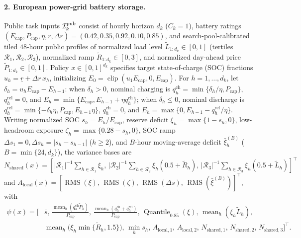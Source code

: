 \paragraph{2. European power-grid battery storage.}
Public task inputs $\mathcal{I}_k^{\mathrm{pub}}$ consist of hourly horizon $d_k$ ($C_k = 1$), battery ratings $(E_{\mathrm{cap}}, P_{\mathrm{cap}}, \eta, \underline{r}, \Delta r) = (0.42, 0.35, 0.92, 0.10, 0.85)$, and search-pool-calibrated tiled $48$-hour public profiles of normalized load level $\tilde{L}_{1:d_k} \in [0,1]$ (tertiles $\mathcal{R}_1, \mathcal{R}_2, \mathcal{R}_3$), normalized ramp $\tilde{R}_{1:d_k} \in [0,3]$, and normalized day-ahead price $\tilde{P}_{1:d_k} \in [0,1]$. Policy $x \in [0,1]^{d_k}$ specifies target state-of-charge (SOC) fractions $u_h = \underline{r} + \Delta r\, x_h$, initializing $E_0 = \operatorname{clip}(u_1 E_{\mathrm{cap}}, 0, E_{\mathrm{cap}})$. For $h = 1,\dots,d_k$, let $\delta_h = u_h E_{\mathrm{cap}} - E_{h-1}$: when $\delta_h > 0$, nominal charging is $q_h^{\mathrm{ch}} = \min\{\delta_h/\eta, P_{\mathrm{cap}}\}$, $q_h^{\mathrm{rel}} = 0$, and $E_h = \min\{E_{\mathrm{cap}}, E_{h-1} + \eta q_h^{\mathrm{ch}}\}$; when $\delta_h \le 0$, nominal discharge is $q_h^{\mathrm{rel}} = \min\{-\delta_h\eta, P_{\mathrm{cap}}, E_{h-1}\eta\}$, $q_h^{\mathrm{ch}} = 0$, and $E_h = \max\{0, E_{h-1} - q_h^{\mathrm{rel}}/\eta\}$. Writing normalized SOC $s_h = E_h / E_{\mathrm{cap}}$, reserve deficit $\xi_h = \max\{1 - s_h, 0\}$, low-headroom exposure $\zeta_h = \max\{0.28 - s_h, 0\}$, SOC ramp $\Delta s_1 = 0, \Delta s_h = |s_h - s_{h-1}|$ ($h \ge 2$), and $B$-hour moving-average deficit $\bar{\xi}_h^{(B)}$ ($B = \min\{24, d_k\}$), the variance bases are $N_{\mathrm{shared}}(x) = [|\mathcal{R}_1|^{-1}\sum_{h\in\mathcal{R}_1}\xi_h,\, |\mathcal{R}_2|^{-1}\sum_{h\in\mathcal{R}_2}\xi_h(0.5+\tilde{R}_h),\, |\mathcal{R}_3|^{-1}\sum_{h\in\mathcal{R}_3}\xi_h(0.5+\tilde{L}_h)]^\top$ and $A_{\mathrm{local}}(x) = [\operatorname{RMS}(\xi),\, \operatorname{RMS}(\zeta),\, \operatorname{RMS}(\Delta s),\, \operatorname{RMS}(\bar{\xi}^{(B)})]^\top$, with
\begin{align*}
  \psi(x) = \Big[&\bar{s},\, \tfrac{\operatorname{mean}_h(q_h^{\mathrm{ch}}\tilde{P}_h)}{P_{\mathrm{cap}}},\, \tfrac{\operatorname{mean}_h(q_h^{\mathrm{ch}}+q_h^{\mathrm{rel}})}{P_{\mathrm{cap}}},\, \operatorname{Quantile}_{0.85}(\xi),\, \operatorname{mean}_h(\xi_h\tilde{L}_h), \\
  &\operatorname{mean}_h\big(\xi_h\min\{\tilde{R}_h, 1.5\}\big),\, \min_h s_h,\, A_{\mathrm{local},1},\, A_{\mathrm{local},2},\, N_{\mathrm{shared},1},\, N_{\mathrm{shared},2},\, N_{\mathrm{shared},3}\Big]^\top.
\end{align*}

